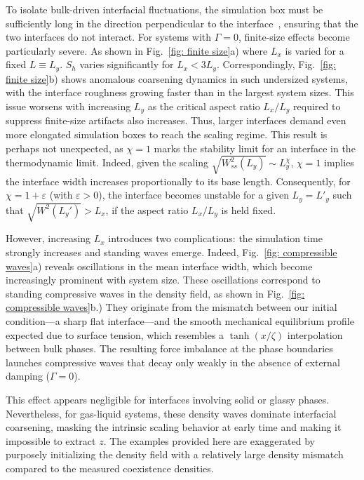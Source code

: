 \documentclass[aps,
reprint,
superscriptaddress,









amsmath,amssymb,floatfix,






prl
]{revtex4-2}
\begin{document}
To isolate bulk-driven interfacial fluctuations, the simulation box must be sufficiently long in the direction perpendicular to the interface~\cite{grant1983fluctuating}, ensuring that the two interfaces do not interact. For systems with $\Gamma = 0$, finite-size effects become particularly severe. As shown in Fig.~\ref{fig: finite size}a) where $L_x$ is varied for a fixed $L\equiv L_y$. $S_h$ varies significantly for $L_x < 3L_y$. Correspondingly, Fig.~\ref{fig: finite size}b) shows anomalous coarsening dynamics in such undersized systems, with the interface roughness growing faster than in the largest system sizes. This issue worsens with increasing $L_y$ as the critical aspect ratio $L_x/L_y$ required to suppress finite-size artifacts also increases. Thus, larger interfaces demand even more elongated simulation boxes to reach the scaling regime. This result is perhaps not unexpected, as $\chi = 1$ marks the stability limit for an interface in the thermodynamic limit. Indeed, given the scaling $\sqrt{W^2_{ss}(L_y)} \sim L_y^{\chi}$, $\chi = 1$ implies the interface width increases proportionally to its base length. Consequently, for $\chi = 1 + \varepsilon$ (with $\varepsilon > 0$), the interface becomes unstable for a given $L_y=L'_y$ such that $\sqrt{W^2(L_y')}>L_x$, if the aspect ratio $L_x/L_y$ is held fixed.


However, increasing $L_x$ introduces two complications: the simulation time strongly increases and standing waves emerge. Indeed, Fig.~\ref{fig: compressible waves}a) reveals oscillations in the mean interface width, which become increasingly prominent with system size. These oscillations correspond to standing compressive waves in the density field, as shown in Fig.~\ref{fig: compressible waves}b.) They originate from the mismatch between our initial condition---a sharp flat interface---and the smooth mechanical equilibrium profile expected due to surface tension, which resembles a $\tanh(x/\zeta)$ interpolation between bulk phases. The resulting force imbalance at the phase boundaries launches compressive waves that decay only weakly in the absence of external damping ($\Gamma=0$).

This effect appears negligible for interfaces involving solid or glassy phases. Nevertheless, for gas-liquid systems, these density waves dominate interfacial coarsening, masking the intrinsic scaling behavior at early time and making it impossible to extract $z$. The examples provided here are exaggerated by purposely initializing the density field with a relatively large density mismatch compared to the measured coexistence densities.
\end{document}
